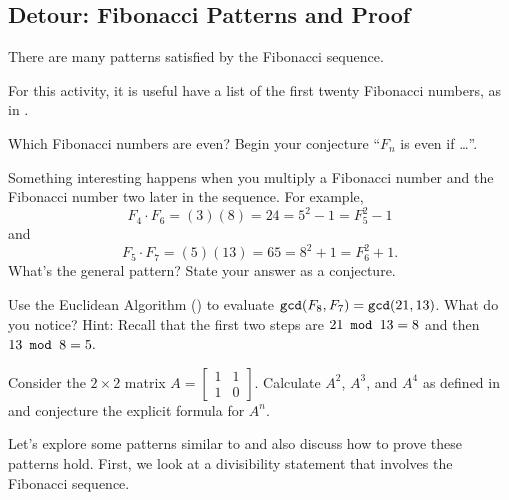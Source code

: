 
\newcommand{\subfibpatterns}{Detour: Fibonacci Patterns and Proof}
\subsection{\subfibpatterns}
\label{sub_fib_patterns_proof}

There are many patterns satisfied by the Fibonacci sequence.  

\begin{act}
\label{act_fib_patterns}
    For this activity, it is useful have a list of the first twenty Fibonacci numbers, as in .
    \begin{actpart}
        \item \label{part_fib_conj_even} Which Fibonacci numbers are even?  Begin your conjecture ``$F_n$ is even if \ldots''.
        \item \label{part_fib_cassini_conj} Something interesting happens when you multiply a Fibonacci number and the Fibonacci number two later in the sequence. For example, $$F_4 \cdot F_6 = (3)(8) = 24 = 5^2 -1 = F_5^2 - 1$$ and $$F_5 \cdot F_7 = (5)(13) = 65 = 8^2 + 1 = F_6^2 + 1.$$  What's the general pattern?  State your answer as a conjecture. 
        \item Use the Euclidean Algorithm () to evaluate $\texttt{gcd}(F_8,F_7)=\texttt{gcd}(21,13)$. What do you notice? Hint: Recall that the first two steps are  $21 \texttt{ mod } 13 = 8$ and then $13 \texttt{ mod } 8 = 5.$
        \item \label{part_fib_matrix_conj} Consider the $2 \times 2$ matrix $A= \left[ \begin{array}{cc} 1 & 1\\ 1 & 0 \end{array} \right]$. Calculate $A^2$, $A^3$, and $A^4$ as defined in  and conjecture the explicit formula for $A^n$.
    \end{actpart}
\end{act}

Let's explore some patterns similar to  and also discuss how to prove these patterns hold.  First, we look at a divisibility statement that involves the Fibonacci sequence.

